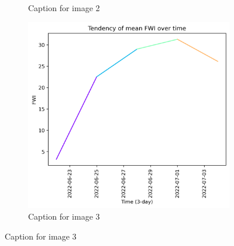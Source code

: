 \begin{figure}[h]
\begin{subfigure}{0.3\textwidth}
        \caption{Caption for image 2}
        \label{fig:img2}
    \end{subfigure}
    \hfill
    \begin{subfigure}{0.3\textwidth}
        \centering
        \includegraphics[width=\textwidth]{graphs/2022/tendency/2022_tendency_graph_FWI.png}
        \caption{Caption for image 3}
        \label{fig:img3}
    \end{subfigure}
    
    \label{fig:all_images}
\end{figure}

